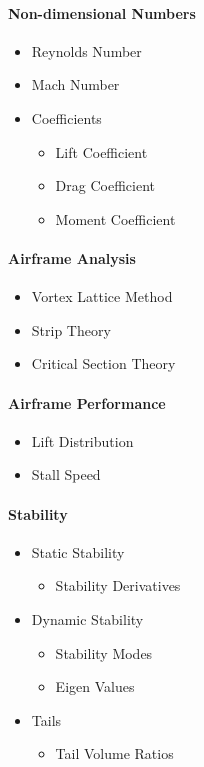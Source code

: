 \documentclass[11pt,twocolumn]{article}
\begin{document}
\paragraph{Non-dimensional Numbers}
\begin{itemize}
	\item Reynolds Number
	\item Mach Number
	\item Coefficients
	\begin{itemize}
		\item Lift Coefficient
		\item Drag Coefficient
		\item Moment Coefficient
	\end{itemize}
\end{itemize}

\paragraph{Airframe Analysis}
\begin{itemize}
	\item Vortex Lattice Method
	\item Strip Theory
	\item Critical Section Theory
\end{itemize}
	
\paragraph{Airframe Performance}
\begin{itemize}
	\item Lift Distribution
	\item Stall Speed
\end{itemize}

\paragraph{Stability}
\begin{itemize}
	\item Static Stability
	\begin{itemize}
		\item Stability Derivatives
	\end{itemize}
	\item Dynamic Stability
	\begin{itemize}
		\item Stability Modes
		\item Eigen Values
	\end{itemize}
	\item Tails
	\begin{itemize}
		\item Tail Volume Ratios
	\end{itemize}
\end{itemize}
\end{document}
